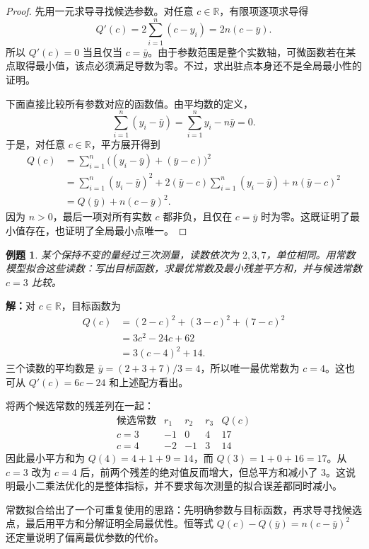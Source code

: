 \documentclass[UTF8,fontset=fandol,11pt]{ctexart}
\newtheorem{example}[definition]{例题}
\begin{document}
\begin{proof}
先用一元求导寻找候选参数。对任意 $c\in\mathbb{R}$，有限项逐项求导得
\[
Q'(c)=2\sum_{i=1}^{n}(c-y_i)=2n(c-\bar{y}).
\]
所以 $Q'(c)=0$ 当且仅当 $c=\bar{y}$。由于参数范围是整个实数轴，可微函数若在某点取得最小值，该点必须满足导数为零。不过，求出驻点本身还不是全局最小性的证明。

下面直接比较所有参数对应的函数值。由平均数的定义，
\[
\sum_{i=1}^{n}(y_i-\bar{y})=\sum_{i=1}^{n}y_i-n\bar{y}=0.
\]
于是，对任意 $c\in\mathbb{R}$，平方展开得到
\[
\begin{aligned}
Q(c)&=\sum_{i=1}^{n}\bigl((y_i-\bar{y})+(\bar{y}-c)\bigr)^2\\
&=\sum_{i=1}^{n}(y_i-\bar{y})^2
 +2(\bar{y}-c)\sum_{i=1}^{n}(y_i-\bar{y})
 +n(\bar{y}-c)^2\\
&=Q(\bar{y})+n(c-\bar{y})^2.
\end{aligned}
\]
因为 $n>0$，最后一项对所有实数 $c$ 都非负，且仅在 $c=\bar{y}$ 时为零。这既证明了最小值存在，也证明了全局最小点唯一。
\end{proof}
\begin{example}
某个保持不变的量经过三次测量，读数依次为 $2,3,7$，单位相同。用常数模型拟合这些读数：写出目标函数，求最优常数及最小残差平方和，并与候选常数 $c=3$ 比较。
\end{example}
\par\noindent\textbf{解：}对 $c\in\mathbb{R}$，目标函数为
\[
\begin{aligned}
Q(c)&=(2-c)^2+(3-c)^2+(7-c)^2\\
&=3c^2-24c+62\\
&=3(c-4)^2+14.
\end{aligned}
\]
三个读数的平均数是 $\bar{y}=(2+3+7)/3=4$，所以唯一最优常数为 $c=4$。这也可从 $Q'(c)=6c-24$ 和上述配方看出。

将两个候选常数的残差列在一起：
\[
\begin{array}{c|rrr|r}
\text{候选常数}&r_1&r_2&r_3&Q(c)\\ \hline
c=3&-1&0&4&17\\
c=4&-2&-1&3&14
\end{array}
\]
因此最小平方和为 $Q(4)=4+1+9=14$，而 $Q(3)=1+0+16=17$。从 $c=3$ 改为 $c=4$ 后，前两个残差的绝对值反而增大，但总平方和减小了 $3$。这说明最小二乘法优化的是整体指标，并不要求每次测量的拟合误差都同时减小。\par
常数拟合给出了一个可重复使用的思路：先明确参数与目标函数，再求导寻找候选点，最后用平方和分解证明全局最优性。恒等式 $Q(c)-Q(\bar{y})=n(c-\bar{y})^2$ 还定量说明了偏离最优参数的代价。
\end{document}
